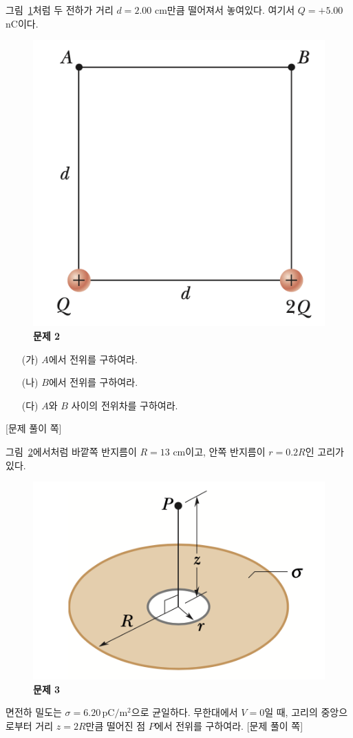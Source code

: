 \documentclass[tightenlines,floatfix,nofootinbib,superscriptaddress,fleqn]{revtex4}
\begin{document}
그림~\ref{fig:1}처럼 두 전하가 거리
$d=2.00$ cm만큼 떨어져서 놓여있다. 여기서 $Q=+5.00$ nC이다. 
\begin{figure}[htp]
  \centering
  \includegraphics[scale=0.6]{qfig5-1.png}
  \caption{\textbf{문제 2}}
  \label{fig:1}
\end{figure}
\begin{itemize}
\item[(가)] $A$에서 전위를 구하여라.
\item[(나)] $B$에서 전위를 구하여라.
\item[(다)] $A$와 $B$ 사이의 전위차를 구하여라.
\end{itemize}
\newpage
{\color{gray} [문제 풀이 쪽]}
\newpage

그림~\ref{fig:2}에서처럼 바깥쪽 반지름이
$R=13$ cm이고, 안쪽 반지름이 $r=0.2R$인 고리가 있다.
\begin{figure}[htp]
  \centering
  \includegraphics[scale=0.6]{qfig5-2.png}
  \caption{\textbf{문제 3}}
  \label{fig:2}
\end{figure}
 면전하 밀도는
$\sigma=6.20\,\mathrm{pC/m^2}$으로 균일하다. 무한대에서 $V=0$일 때,
고리의 중앙으로부터 거리 $z=2R$만큼 떨어진 점 $P$에서 전위를 구하여라. 
\newpage
{\color{gray} [문제 풀이 쪽]}
\newpage
\end{document}
